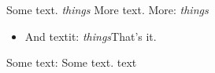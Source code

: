 Some text.
\emph{things}
More text.
More:
\emph{things}
\begin{itemize}
\item And textit:
\textit{things}That's it.
\end{itemize}
Some text:
Some text.
text

